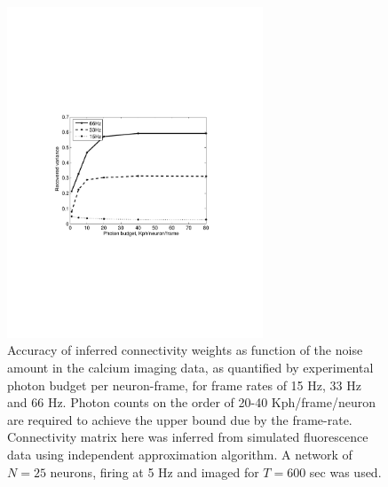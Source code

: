 \begin{figure}[h]
\centering
\includegraphics[width=3in]{../figs/FigureA6_recvar_SNR}
\caption{Accuracy of inferred connectivity weights as function of the noise amount in the calcium imaging data, as quantified by experimental photon budget per neuron-frame, for frame rates of 15 Hz, 33 Hz and 66 Hz. Photon counts on the order of 20-40 Kph/frame/neuron are required to achieve the upper bound due by the frame-rate. Connectivity matrix here was inferred from simulated fluorescence data using independent approximation algorithm. A network of $N=25$ neurons, firing at 5 Hz and imaged for $T=600$ sec was used.}
\label{fig:recvar-SNR}
\end{figure}

